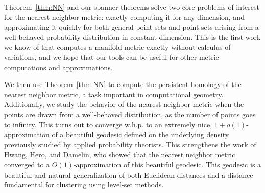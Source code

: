 Theorem~\ref{thm:NN} and our spanner theorems solve two core problems of
interest for the nearest neighbor metric: exactly computing it for any
dimension, and approximating it quickly for both general point sets and
point sets arising from a well-behaved probability distribution in constant
dimension. This is the first work we know of that computes a manifold
metric exactly without calculus of variations, and we hope that our tools
can be useful for other metric computations and approximations.


 We then use Theorem~\ref{thm:NN} to compute the persistent homology
of the nearest neighbor metric, a task important in computational geometry.
Additionally, we study the behavior of the nearest neighbor metric when the
points are drawn from a well-behaved distribution, as the number of points
goes to infinity. This turns out to converge w.h.p. to an extremely nice,
$1+o(1)$-approximation of a beautiful geodesic defined on the underlying
density previously studied by applied probability theorists. This
strengthens the work of Hwang, Hero, and Damelin, who showed that the
nearest neighbor metric converged to a $O(1)$-approximation of this
beautiful geodesic. This geodesic is a beautiful and natural generalization
of both Euclidean distances and a distance fundamental for clustering using
level-set methods.
